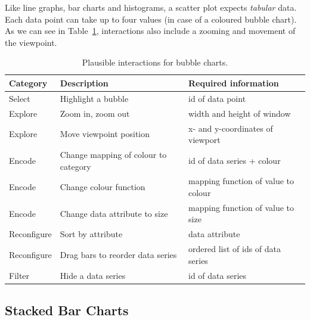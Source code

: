 Like line graphs, bar charts and histograms, a scatter plot expects \emph{tabular} data.
Each data point can take up to four values (in case of a coloured bubble chart).
As we can see in Table~\ref{tab:analysis:bubble-charts:interactions}, interactions also include a zooming and movement of the viewpoint.
\begin{table}[H]
  \caption{Plausible interactions for bubble charts.}%
  \label{tab:analysis:bubble-charts:interactions}
  \begin{tabular*}{\textwidth}{lll}
    \bf Category & \bf Description & \bf Required information \\
    \hline
    Select & Highlight a bubble & id of data point \\
    Explore & Zoom in, zoom out & width and height of window \\
    Explore & Move viewpoint position & x- and y-coordinates of viewport \\
    Encode & Change mapping of colour to category & id of data series + colour \\
    Encode & Change colour function & mapping function of value to colour \\
    Encode & Change data attribute to size & mapping function of value to size \\
    Reconfigure & Sort by attribute & data attribute \\
    Reconfigure & Drag bars to reorder data series & ordered list of ids of data series \\
    Filter & Hide a data series & id of data series \\
  \end{tabular*}
\end{table}

\subsection{Stacked Bar Charts}

